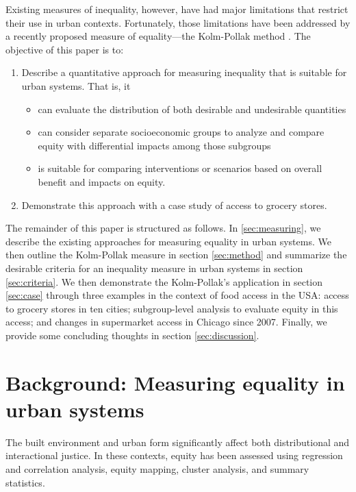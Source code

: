 \documentclass[final,3p,times,onecolumn,sort&compress]{elsarticle}
\begin{document}
Existing measures of inequality, however, have had major limitations that restrict their use in urban contexts. 
Fortunately, those limitations have been addressed by a recently proposed measure of equality---the Kolm-Pollak method \citep{Sheriff2020-ge}.
The objective of this paper is to:
\begin{enumerate}
    \item Describe a quantitative approach for measuring inequality that is suitable for urban systems. That is, it
    \begin{itemize}
        \item can evaluate the distribution of both desirable and undesirable quantities
        \item can consider separate socioeconomic groups to analyze and compare equity with differential impacts among those subgroups
        \item is suitable for comparing interventions or scenarios based on overall benefit and impacts on equity.
    \end{itemize}
    \item Demonstrate this approach with a case study of access to grocery stores.
\end{enumerate}

The remainder of this paper is structured as follows. In \autoref{sec:measuring}, we describe the existing approaches for measuring equality in urban systems. 
We then outline the Kolm-Pollak measure in section \ref{sec:method} and summarize the desirable criteria for an inequality measure in urban systems in section \ref{sec:criteria}.
We then demonstrate the Kolm-Pollak's application in section \ref{sec:case} through three examples in the context of food access in the USA:
access to grocery stores in ten cities;
subgroup-level analysis to evaluate equity in this access; and
changes in supermarket access in Chicago since 2007.
Finally, we provide some concluding thoughts in section \ref{sec:discussion}.

\section{Background: Measuring equality in urban systems}
\label{sec:measuring}
The built environment and urban form significantly affect both distributional and interactional justice. 
In these contexts, equity has been assessed using regression and correlation analysis, equity mapping, cluster analysis, and summary statistics.
\end{document}

